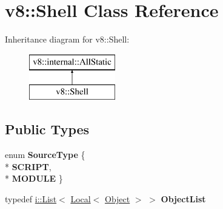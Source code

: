 \hypertarget{classv8_1_1_shell}{}\section{v8\+:\+:Shell Class Reference}
\label{classv8_1_1_shell}
Inheritance diagram for v8\+:\+:Shell\+:\begin{figure}[H]
\begin{center}
\leavevmode
\includegraphics[height=2.000000cm]{classv8_1_1_shell}
\end{center}
\end{figure}
\subsection*{Public Types}
\begin{DoxyCompactItemize}
\item 
enum {\bfseries Source\+Type} \{ \\*
{\bfseries S\+C\+R\+I\+PT}, 
\\*
{\bfseries M\+O\+D\+U\+LE}
 \}\hypertarget{classv8_1_1_shell_abe245a5c0e5af60c732a9b915f70a980}{}\label{classv8_1_1_shell_abe245a5c0e5af60c732a9b915f70a980}

\item 
typedef \hyperlink{classv8_1_1internal_1_1_list}{i\+::\+List}$<$ \hyperlink{classv8_1_1_local}{Local}$<$ \hyperlink{classv8_1_1_object}{Object} $>$ $>$ {\bfseries Object\+List}\hypertarget{classv8_1_1_shell_aae1fed615f7a91949352cdfb08151181}{}\label{classv8_1_1_shell_aae1fed615f7a91949352cdfb08151181}

\end{DoxyCompactItemize}
